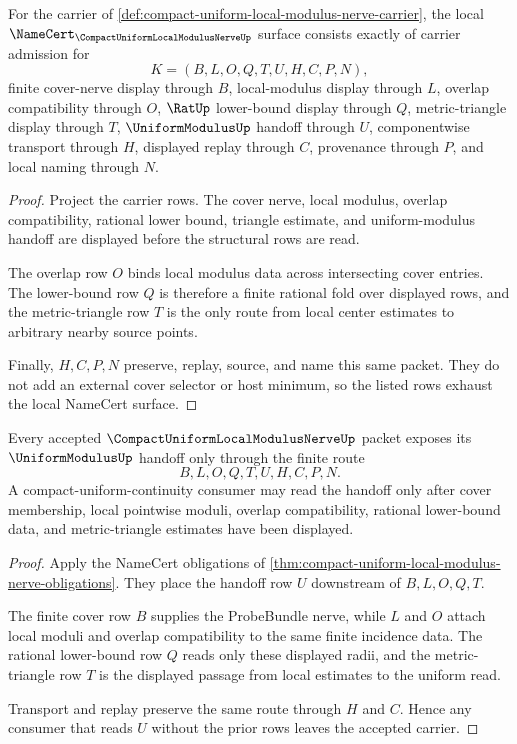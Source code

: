 \begin{theorem}
\label{thm:compact-uniform-local-modulus-nerve-obligations}
For the carrier of \autoref{def:compact-uniform-local-modulus-nerve-carrier}, the local $\NameCert_{\CompactUniformLocalModulusNerveUp}$ surface consists exactly of carrier admission for
$$
K=(B,L,O,Q,T,U,H,C,P,N),
$$
finite cover-nerve display through $B$, local-modulus display through $L$, overlap compatibility through $O$, $\RatUp$ lower-bound display through $Q$, metric-triangle display through $T$, $\UniformModulusUp$ handoff through $U$, componentwise transport through $H$, displayed replay through $C$, provenance through $P$, and local naming through $N$.
\end{theorem}
\begin{proof}
Project the carrier rows. The cover nerve, local modulus, overlap compatibility, rational lower bound, triangle estimate, and uniform-modulus handoff are displayed before the structural rows are read.

The overlap row $O$ binds local modulus data across intersecting cover entries. The lower-bound row $Q$ is therefore a finite rational fold over displayed rows, and the metric-triangle row $T$ is the only route from local center estimates to arbitrary nearby source points.

Finally, $H,C,P,N$ preserve, replay, source, and name this same packet. They do not add an external cover selector or host minimum, so the listed rows exhaust the local NameCert surface.
\end{proof}

\begin{theorem}
\label{thm:compact-uniform-local-modulus-nerve-uniform-modulus-handoff}
Every accepted $\CompactUniformLocalModulusNerveUp$ packet exposes its $\UniformModulusUp$ handoff only through the finite route
$$
B,L,O,Q,T,U,H,C,P,N.
$$
A compact-uniform-continuity consumer may read the handoff only after cover membership, local pointwise moduli, overlap compatibility, rational lower-bound data, and metric-triangle estimates have been displayed.
\end{theorem}
\begin{proof}
Apply the NameCert obligations of \autoref{thm:compact-uniform-local-modulus-nerve-obligations}. They place the handoff row $U$ downstream of $B,L,O,Q,T$.

The finite cover row $B$ supplies the ProbeBundle nerve, while $L$ and $O$ attach local moduli and overlap compatibility to the same finite incidence data. The rational lower-bound row $Q$ reads only these displayed radii, and the metric-triangle row $T$ is the displayed passage from local estimates to the uniform read.

Transport and replay preserve the same route through $H$ and $C$. Hence any consumer that reads $U$ without the prior rows leaves the accepted carrier.
\end{proof}


